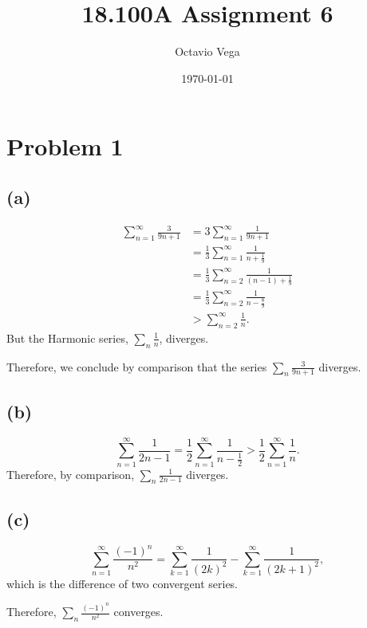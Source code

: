 \documentclass{article}
\title{18.100A Assignment 6}
\author{Octavio Vega}
\date\today
\begin{document}
\maketitle
	
\section*{Problem 1}
\subsection*{(a)}
\begin{align}
	\sum_{n=1}^{\infty} \frac{3}{9n+1} &= 3\sum_{n=1}^{\infty} \frac{1}{9n+1} \\
	&= \frac{1}{3}\sum_{n=1}^{\infty}\frac{1}{n+\frac{1}{9}} \\
	&= \frac{1}{3}\sum_{n=2}^{\infty}\frac{1}{(n-1)+\frac{1}{9}} \\
	&= \frac{1}{3}\sum_{n=2}^{\infty} \frac{1}{n-\frac{8}{9}} \\
	&> \sum_{n=2}^{\infty} \frac{1}{n}.
\end{align}
But the Harmonic series, $\sum_n \frac{1}{n}$, diverges.

Therefore, we conclude by comparison that the series $\sum_n \frac{3}{9n+1}$ diverges.

\subsection*{(b)}
\begin{equation}
	\sum_{n=1}^{\infty}\frac{1}{2n-1} = \frac{1}{2}\sum_{n=1}^{\infty}\frac{1}{n-\frac{1}{2}} > \frac{1}{2}\sum_{n=1}^{\infty}\frac{1}{n}.
\end{equation}
Therefore, by comparison, $\sum_n \frac{1}{2n-1}$ diverges.

\subsection*{(c)}
\begin{equation}
	\sum_{n=1}^{\infty} \frac{(-1)^n}{n^2} = \sum_{k=1}^{\infty}\frac{1}{(2k)^2} - \sum_{k=1}^{\infty}\frac{1}{(2k+1)^2},
\end{equation}
which is the difference of two convergent series. 

Therefore, $\sum_n \frac{(-1)^n}{n^2}$ converges.
\end{document}

